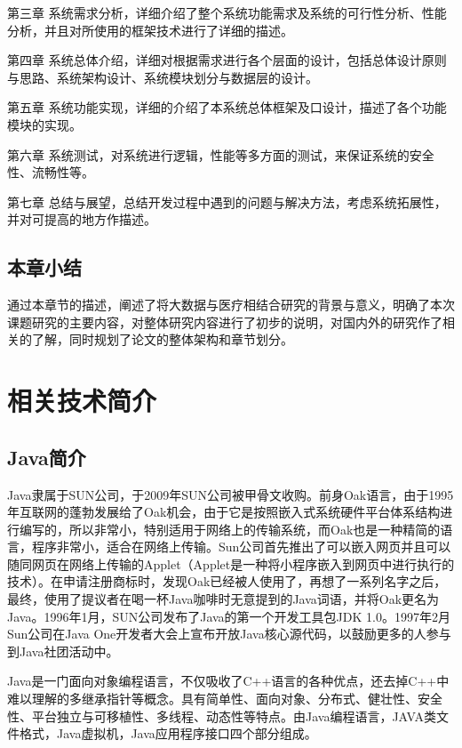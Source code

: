 \documentclass{husethesis}
\begin{document}
第三章 系统需求分析，详细介绍了整个系统功能需求及系统的可行性分析、性能分析，并且对所使用的框架技术进行了详细的描述。

第四章 系统总体介绍，详细对根据需求进行各个层面的设计，包括总体设计原则与思路、系统架构设计、系统模块划分与数据层的设计。

第五章 系统功能实现，详细的介绍了本系统总体框架及口设计，描述了各个功能模块的实现。

第六章 系统测试，对系统进行逻辑，性能等多方面的测试，来保证系统的安全性、流畅性等。

第七章 总结与展望，总结开发过程中遇到的问题与解决方法，考虑系统拓展性，并对可提高的地方作描述。

\subsection{本章小结}
通过本章节的描述，阐述了将大数据与医疗相结合研究的背景与意义，明确了本次课题研究的主要内容，对整体研究内容进行了初步的说明，对国内外的研究作了相关的了解，同时规划了论文的整体架构和章节划分。
\clearpage                        %


\section{相关技术简介}


\subsection{Java简介}
Java隶属于SUN公司，于2009年SUN公司被甲骨文收购。前身Oak语言，由于1995年互联网的蓬勃发展给了Oak机会，由于它是按照嵌入式系统硬件平台体系结构进行编写的，所以非常小，特别适用于网络上的传输系统，而Oak也是一种精简的语言，程序非常小，适合在网络上传输\cite{ref1}。Sun公司首先推出了可以嵌入网页并且可以随同网页在网络上传输的Applet（Applet是一种将小程序嵌入到网页中进行执行的技术）。在申请注册商标时，发现Oak已经被人使用了，再想了一系列名字之后，最终，使用了提议者在喝一杯Java咖啡时无意提到的Java词语，并将Oak更名为Java。1996年1月，SUN公司发布了Java的第一个开发工具包JDK 1.0。1997年2月Sun公司在Java One开发者大会上宣布开放Java核心源代码，以鼓励更多的人参与到Java社团活动中。

Java是一门面向对象编程语言，不仅吸收了C++语言的各种优点，还去掉C++中难以理解的多继承指针等概念。具有简单性、面向对象、分布式、健壮性、安全性、平台独立与可移植性、多线程、动态性等特点。由Java编程语言，JAVA类文件格式，Java虚拟机，Java应用程序接口四个部分组成\cite{ref2}。
\end{document}
